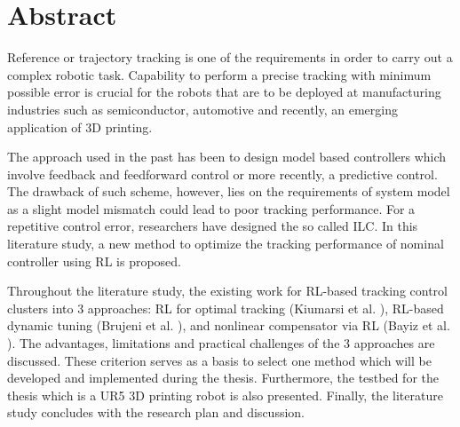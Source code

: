 %
\chapter*{Abstract}%

Reference or trajectory tracking is one of the requirements in order to carry out a complex robotic task. Capability to perform a precise tracking with minimum possible error is crucial for the robots that are to be deployed at manufacturing industries such as semiconductor, automotive and recently, an emerging application of \ac{3D} printing.

The approach used in the past has been to design model based controllers which involve feedback and feedforward control or more recently, a predictive control. The drawback of such scheme, however, lies on the requirements of system model as a slight model mismatch could lead to poor tracking performance. For a repetitive control error, researchers have designed the so called \ac{ILC}. In this literature study, a new method to optimize the tracking performance of nominal controller using \ac{RL} is proposed. 

Throughout the literature study, the existing work for \acs{RL}-based tracking control clusters into 3 approaches: \acs{RL} for optimal tracking (Kiumarsi et al. \cite{Kiumarsi6760476}), \acs{RL}-based dynamic tuning (Brujeni et al. \cite{Brujeni5669655}), and nonlinear compensator via \acs{RL} (Bayiz et al. \cite{Efe2014}). The advantages, limitations and practical challenges of the 3 approaches are discussed. These criterion serves as a basis to select one method which will be developed and implemented during the thesis. Furthermore, the testbed for the thesis which is a UR5 \acs{3D} printing robot is also presented. Finally, the literature study concludes with the research plan and discussion.